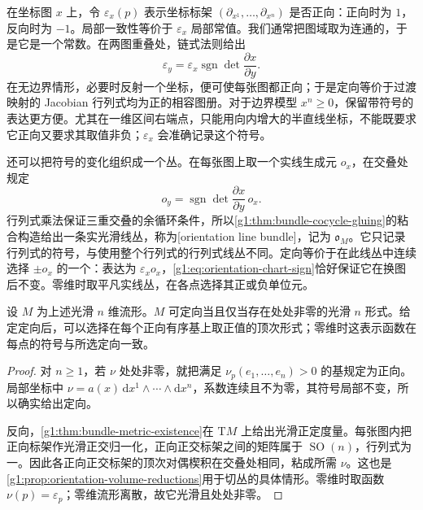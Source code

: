 在坐标图 \(x\) 上，令 \(\varepsilon_x(p)\) 表示坐标标架 \((\partial_{x^1},\ldots,\partial_{x^n})\) 是否正向：正向时为 \(1\)，反向时为 \(-1\)。局部一致性等价于 \(\varepsilon_x\) 局部常值。我们通常把图域取为连通的，于是它是一个常数。在两图重叠处，链式法则给出
\begin{equation}\label{g1:eq:orientation-chart-sign}
	\varepsilon_y=\varepsilon_x\operatorname{sgn}\det\frac{\partial x}{\partial y}.
\end{equation}
在无边界情形，必要时反射一个坐标，便可使每张图都正向；于是定向等价于过渡映射的 Jacobian 行列式均为正的相容图册。对于边界模型 \(x^n\geq0\)，保留带符号的表达更方便。尤其在一维区间右端点，只能用向内增大的半直线坐标，不能既要求它正向又要求其取值非负；\(\varepsilon_x\) 会准确记录这个符号。

\ProseParagraphBreak

还可以把符号的变化组织成一个丛。在每张图上取一个实线生成元 \(o_x\)，在交叠处规定
\[
	o_y=\operatorname{sgn}\det\frac{\partial x}{\partial y}\,o_x.
\]
行列式乘法保证三重交叠的余循环条件，所以\cref{g1:thm:bundle-cocycle-gluing}的粘合构造给出一条实光滑线丛，称为[orientation line bundle]，记为 \(\mathfrak o_M\)。它只记录行列式的符号，与使用整个行列式的行列式线丛不同。定向等价于在此线丛中连续选择 \(\pm o_x\) 的一个：表达为 \(\varepsilon_xo_x\)，\eqref{g1:eq:orientation-chart-sign}恰好保证它在换图后不变。零维时取平凡实线丛，在各点选择其正或负单位元。

\begin{proposition}
	\label{g1:prop:orientation-nonvanishing-form}
	设 \(M\) 为上述光滑 \(n\) 维流形。\(M\) 可定向当且仅当存在处处非零的光滑 \(n\) 形式。给定定向后，可以选择在每个正向有序基上取正值的顶次形式；零维时这表示函数在每点的符号与所选定向一致。
\end{proposition}
\begin{proof}
	对 \(n\geq1\)，若 \(\nu\) 处处非零，就把满足 \(\nu_p(e_1,\ldots,e_n)>0\) 的基规定为正向。局部坐标中 \(\nu=a(x)\,\mathrm{d}x^1\wedge\cdots\wedge\mathrm{d}x^n\)，系数连续且不为零，其符号局部不变，所以确实给出定向。

	反向，\cref{g1:thm:bundle-metric-existence}在 \(\mathrm{T}M\) 上给出光滑正定度量。每张图内把正向标架作光滑正交归一化，正向正交标架之间的矩阵属于 \(\operatorname{SO}(n)\)，行列式为一。因此各正向正交标架的顶次对偶楔积在交叠处相同，粘成所需 \(\nu\)。这也是\cref{g1:prop:orientation-volume-reductions}用于切丛的具体情形。零维时取函数 \(\nu(p)=\varepsilon_p\)；零维流形离散，故它光滑且处处非零。
\end{proof}

